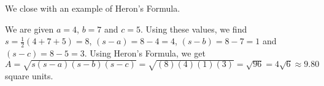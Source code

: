 \bigskip

We close with an example of Heron's Formula.

\medskip

{ We are given $a = 4$, $b=7$ and $c = 5$.  Using these values, we find $s = \frac{1}{2}(4+7+5) = 8$, $(s - a) = 8 - 4 = 4$, $(s-b) = 8-7 =1$ and $(s-c) = 8-5=3$. Using Heron's Formula, we get $A = \sqrt{s(s-a)(s-b)(s-c)} = \sqrt{(8)(4)(1)(3)} = \sqrt{96} = 4\sqrt{6} \approx 9.80$ square units.}

